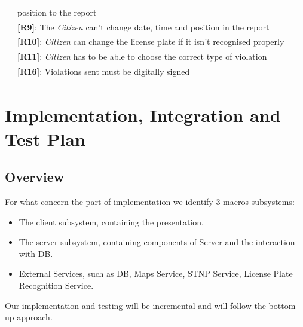 \documentclass{article}
\begin{document}
\begin{center}
\begin{tabular}{ | l | l |}
                        & position to the report \\
                        & \textbf{[R9]}: The \textit{Citizen} can’t change date, time and position in the report \\ 
                        & \textbf{[R10]}: \textit{Citizen} can change the license plate if it isn’t recognised properly \\
                        & \textbf{[R11]}: \textit{Citizen} has to be able to choose the correct type of violation \\
                        & \textbf{[R16]}: Violations sent must be digitally signed \\
        \hline
    \end{tabular}
    \end{center}
\clearpage
\section{Implementation, Integration and Test Plan}
\subsection{Overview}
For what concern the part of implementation we identify 3 macros subsystems:
\begin{itemize}
    \item The client subsystem, containing the presentation.
    \item The server subsystem, containing components of Server and the interaction with DB.
    \item External Services, such as DB, Maps Service, STNP Service, License Plate Recognition Service. 
\end{itemize}  
Our implementation and testing will be incremental and will follow the bottom-up approach.
\end{document}
